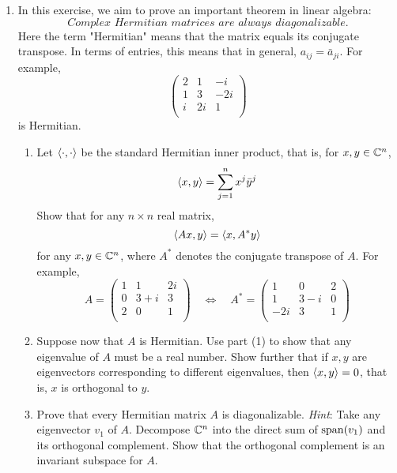 \documentclass[../psets.tex]{subfiles}
\begin{document}
\begin{enumerate}
    \item In this exercise, we aim to prove an important theorem in linear algebra:
    \begin{equation*}
        \textit{Complex Hermitian matrices are always diagonalizable.}
    \end{equation*}
    Here the term "Hermitian" means that the matrix equals its conjugate transpose. In terms of entries, this means that in general, $a_{ij}=\bar{a}_{ji}$. For example,
    \begin{equation*}
        \begin{pmatrix}
            2 & 1 & -i\\
            1 & 3 & -2i\\
            i & 2i & 1\\
        \end{pmatrix}
    \end{equation*}
    is Hermitian.
    \begin{enumerate}
        \item Let $\left\langle{\cdot},{\cdot}\right\rangle$ be the standard Hermitian inner product, that is, for $x,y\in\mathbb{C}^n$,
        \begin{equation*}
            \left\langle{x},{y}\right\rangle = \sum_{j=1}^nx^j\bar{y}^j
        \end{equation*}
        Show that for any $n\times n$ real matrix,
        \begin{equation*}
            \left\langle{Ax},{y}\right\rangle = \left\langle{x},{A^*y}\right\rangle
        \end{equation*}
        for any $x,y\in\mathbb{C}^n$, where $A^*$ denotes the conjugate transpose of $A$. For example,
        \begin{equation*}
            A =
            \begin{pmatrix}
                1 & 1 & 2i\\
                0 & 3+i & 3\\
                2 & 0 & 1\\
            \end{pmatrix}
            \quad\Longleftrightarrow\quad
            A^* =
            \begin{pmatrix}
                1 & 0 & 2\\
                1 & 3-i & 0\\
                -2i & 3 & 1\\
            \end{pmatrix}
        \end{equation*}
        \item Suppose now that $A$ is Hermitian. Use part (1) to show that any eigenvalue of $A$ must be a real number. Show further that if $x,y$ are eigenvectors corresponding to different eigenvalues, then $\left\langle{x},{y}\right\rangle=0$, that is, $x$ is orthogonal to $y$.
        \item Prove that every Hermitian matrix $A$ is diagonalizable. \emph{Hint}: Take any eigenvector $v_1$ of $A$. Decompose $\mathbb{C}^n$ into the direct sum of $\operatorname{span}(v_1)$ and its orthogonal complement. Show that the orthogonal complement is an invariant subspace for $A$.
    \end{enumerate}
\end{enumerate}
\end{document}
